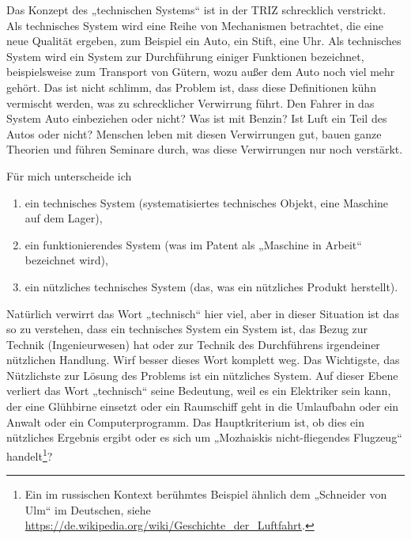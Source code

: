 \documentclass[11pt,a4paper]{article}
\begin{document}
Das Konzept des „technischen Systems“ ist in der TRIZ schrecklich verstrickt.
Als technisches System wird eine Reihe von Mechanismen betrachtet, die eine
neue Qualität ergeben, zum Beispiel ein Auto, ein Stift, eine Uhr. Als
technisches System wird ein System zur Durchführung einiger Funktionen
bezeichnet, beispielsweise zum Transport von Gütern, wozu außer dem Auto noch
viel mehr gehört. Das ist nicht schlimm, das Problem ist, dass diese
Definitionen kühn vermischt werden, was zu schrecklicher Verwirrung führt.
Den Fahrer in das System Auto einbeziehen oder nicht? Was ist mit Benzin? Ist
Luft ein Teil des Autos oder nicht? Menschen leben mit diesen Verwirrungen
gut, bauen ganze Theorien und führen Seminare durch, was diese Verwirrungen
nur noch verstärkt.

Für mich unterscheide ich
\begin{enumerate}
\item ein technisches System (systematisiertes technisches Objekt, eine
  Maschine auf dem Lager),
\item ein funktionierendes System (was im Patent als „Maschine in Arbeit“
  bezeichnet wird),
\item ein nützliches technisches System (das, was ein nützliches Produkt
  herstellt).
\end{enumerate}

Natürlich verwirrt das Wort „technisch“ hier viel, aber in dieser Situation
ist das so zu verstehen, dass ein technisches System ein System ist, das Bezug
zur Technik (Ingenieurwesen) hat oder zur Technik des Durchführens irgendeiner
nützlichen Handlung. Wirf besser dieses Wort komplett weg. Das Wichtigste, das
Nützlichste zur Lösung des Problems ist ein nützliches System. Auf dieser
Ebene verliert das Wort „technisch“ seine Bedeutung, weil es ein Elektriker
sein kann, der eine Glühbirne einsetzt oder ein Raumschiff geht in die
Umlaufbahn oder ein Anwalt oder ein Computerprogramm. Das Hauptkriterium ist,
ob dies ein nützliches Ergebnis ergibt oder es sich um „Mozhaiskis
nicht-fliegendes Flugzeug“ handelt\footnote{Ein im russischen Kontext
  berühmtes Beispiel ähnlich dem „Schneider von Ulm“ im Deutschen, siehe
  \url{https://de.wikipedia.org/wiki/Geschichte_der_Luftfahrt}.}?
\end{document}
